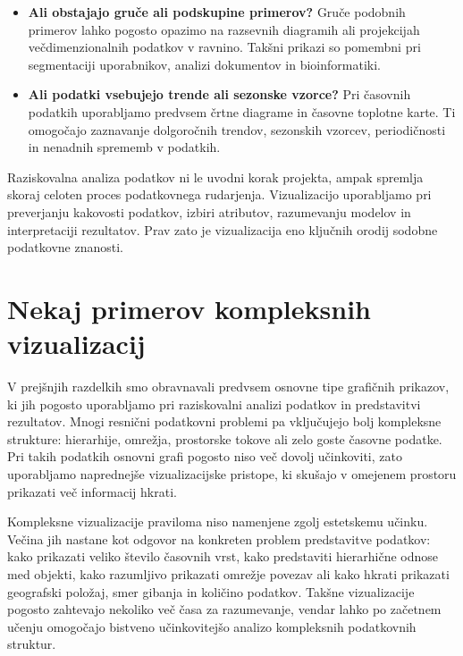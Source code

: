 \begin{itemize}
\item {\bf Ali obstajajo gruče ali podskupine primerov?}
Gruče podobnih primerov lahko pogosto opazimo na razsevnih diagramih ali projekcijah večdimenzionalnih podatkov v ravnino. Takšni prikazi so pomembni pri segmentaciji uporabnikov, analizi dokumentov in bioinformatiki.

\item {\bf Ali podatki vsebujejo trende ali sezonske vzorce?}
Pri časovnih podatkih uporabljamo predvsem črtne diagrame in časovne toplotne karte. Ti omogočajo zaznavanje dolgoročnih trendov, sezonskih vzorcev, periodičnosti in nenadnih sprememb v podatkih.

\end{itemize}

Raziskovalna analiza podatkov ni le uvodni korak projekta, ampak spremlja skoraj celoten proces podatkovnega rudarjenja. Vizualizacijo uporabljamo pri preverjanju kakovosti podatkov, izbiri atributov, razumevanju modelov in interpretaciji rezultatov. Prav zato je vizualizacija eno ključnih orodij sodobne podatkovne znanosti.



\section{Nekaj primerov kompleksnih vizualizacij}

V prejšnjih razdelkih smo obravnavali predvsem osnovne tipe grafičnih prikazov, ki jih pogosto uporabljamo pri raziskovalni analizi podatkov in predstavitvi rezultatov. Mnogi resnični podatkovni problemi pa vključujejo bolj kompleksne strukture: hierarhije, omrežja, prostorske tokove ali zelo goste časovne podatke. Pri takih podatkih osnovni grafi pogosto niso več dovolj učinkoviti, zato uporabljamo naprednejše vizualizacijske pristope, ki skušajo v omejenem prostoru prikazati več informacij hkrati.

Kompleksne vizualizacije praviloma niso namenjene zgolj estetskemu učinku. Večina jih nastane kot odgovor na konkreten problem predstavitve podatkov: kako prikazati veliko število časovnih vrst, kako predstaviti hierarhične odnose med objekti, kako razumljivo prikazati omrežje povezav ali kako hkrati prikazati geografski položaj, smer gibanja in količino podatkov. Takšne vizualizacije pogosto zahtevajo nekoliko več časa za razumevanje, vendar lahko po začetnem učenju omogočajo bistveno učinkovitejšo analizo kompleksnih podatkovnih struktur.

